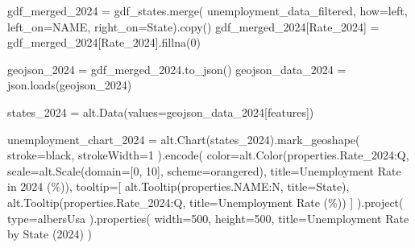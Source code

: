 \documentclass[
  letterpaper,
  DIV=11,
  numbers=noendperiod]{scrartcl}
\newenvironment{Shaded}{\begin{snugshade}}{\end{snugshade}}
\newcommand{\BuiltInTok}[1]{\textcolor[rgb]{0.00,0.23,0.31}{#1}}
\newcommand{\DecValTok}[1]{\textcolor[rgb]{0.68,0.00,0.00}{#1}}
\newcommand{\NormalTok}[1]{\textcolor[rgb]{0.00,0.23,0.31}{#1}}
\newcommand{\OperatorTok}[1]{\textcolor[rgb]{0.37,0.37,0.37}{#1}}
\newcommand{\StringTok}[1]{\textcolor[rgb]{0.13,0.47,0.30}{#1}}
\begin{document}
\begin{Shaded}
\begin{Highlighting}[]
\NormalTok{gdf\_merged\_2024 }\OperatorTok{=}\NormalTok{ gdf\_states.merge(}
\NormalTok{    unemployment\_data\_filtered, how}\OperatorTok{=}\StringTok{\textquotesingle{}left\textquotesingle{}}\NormalTok{, left\_on}\OperatorTok{=}\StringTok{\textquotesingle{}NAME\textquotesingle{}}\NormalTok{, right\_on}\OperatorTok{=}\StringTok{\textquotesingle{}State\textquotesingle{}}\NormalTok{).copy()}
\NormalTok{gdf\_merged\_2024[}\StringTok{\textquotesingle{}Rate\_2024\textquotesingle{}}\NormalTok{] }\OperatorTok{=}\NormalTok{ gdf\_merged\_2024[}\StringTok{\textquotesingle{}Rate\_2024\textquotesingle{}}\NormalTok{].fillna(}\DecValTok{0}\NormalTok{)}

\NormalTok{geojson\_2024 }\OperatorTok{=}\NormalTok{ gdf\_merged\_2024.to\_json()}
\NormalTok{geojson\_data\_2024 }\OperatorTok{=}\NormalTok{ json.loads(geojson\_2024)}

\NormalTok{states\_2024 }\OperatorTok{=}\NormalTok{ alt.Data(values}\OperatorTok{=}\NormalTok{geojson\_data\_2024[}\StringTok{\textquotesingle{}features\textquotesingle{}}\NormalTok{])}

\NormalTok{unemployment\_chart\_2024 }\OperatorTok{=}\NormalTok{ alt.Chart(states\_2024).mark\_geoshape(}
\NormalTok{    stroke}\OperatorTok{=}\StringTok{\textquotesingle{}black\textquotesingle{}}\NormalTok{,}
\NormalTok{    strokeWidth}\OperatorTok{=}\DecValTok{1}
\NormalTok{).encode(}
\NormalTok{    color}\OperatorTok{=}\NormalTok{alt.Color(}\StringTok{\textquotesingle{}properties.Rate\_2024:Q\textquotesingle{}}\NormalTok{,}
\NormalTok{                    scale}\OperatorTok{=}\NormalTok{alt.Scale(domain}\OperatorTok{=}\NormalTok{[}\DecValTok{0}\NormalTok{, }\DecValTok{10}\NormalTok{], scheme}\OperatorTok{=}\StringTok{\textquotesingle{}orangered\textquotesingle{}}\NormalTok{),}
\NormalTok{                    title}\OperatorTok{=}\StringTok{\textquotesingle{}Unemployment Rate in 2024 (\%)\textquotesingle{}}\NormalTok{),}
\NormalTok{    tooltip}\OperatorTok{=}\NormalTok{[}
\NormalTok{        alt.Tooltip(}\StringTok{\textquotesingle{}properties.NAME:N\textquotesingle{}}\NormalTok{, title}\OperatorTok{=}\StringTok{\textquotesingle{}State\textquotesingle{}}\NormalTok{),}
\NormalTok{        alt.Tooltip(}\StringTok{\textquotesingle{}properties.Rate\_2024:Q\textquotesingle{}}\NormalTok{, title}\OperatorTok{=}\StringTok{\textquotesingle{}Unemployment Rate (\%)\textquotesingle{}}\NormalTok{)}
\NormalTok{    ]}
\NormalTok{).project(}
    \BuiltInTok{type}\OperatorTok{=}\StringTok{\textquotesingle{}albersUsa\textquotesingle{}}
\NormalTok{).properties(}
\NormalTok{    width}\OperatorTok{=}\DecValTok{500}\NormalTok{,}
\NormalTok{    height}\OperatorTok{=}\DecValTok{500}\NormalTok{,}
\NormalTok{    title}\OperatorTok{=}\StringTok{\textquotesingle{}Unemployment Rate by State (2024)\textquotesingle{}}
\NormalTok{)}


\end{Highlighting}
\end{Shaded}
\end{document}
